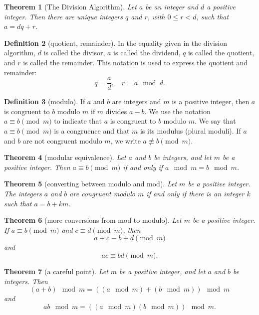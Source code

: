 \documentclass[letterpaper,10pt]{article}
\theoremstyle{plain}
\newtheorem{thm}{Theorem}[section]
\theoremstyle{definition}
\newtheorem{defn}[thm]{Definition}
\theoremstyle{remark}
\begin{document}
\begin{thm}[The Division Algorithm]
Let \(a\) be an integer and \(d\) a positive integer. Then there are unique integers \(q\) and \(r\), with \(0 \leq r < d\), such that \(a = dq + r\).

\end{thm}
\begin{defn}[quotient, remainder]
In the equality given in the division algorithm, \(d\) is called the divisor, \(a\) is called the dividend, \(q\) is called the quotient, and \(r\) is called the remainder. This notation is used to express the quotient and remainder:
\[q = \frac{a}{d}, \quad r = a \mod d.\]


\end{defn}

\begin{defn}[modulo]
If \(a\) and \(b\) are integers and \(m\) is a positive integer, then \(a\) is congruent to \(b\) modulo \(m\) if \(m\) divides \(a - b\). We use the notation \(a \equiv b \pmod{m}\) to indicate that \(a\) is congruent to \(b\) modulo \(m\). We say that \(a \equiv b \pmod{m}\) is a congruence and that \(m\) is its modulus (plural moduli). If \(a\) and \(b\) are not congruent modulo \(m\), we write \(a \not\equiv b \pmod{m}\).


\end{defn}
\begin{thm}[modular equivalence]
Let \(a\) and \(b\) be integers, and let \(m\) be a positive integer. Then \(a \equiv b \pmod{m}\) if and only if \(a \mod m = b \mod m\).

\end{thm}
\begin{thm}[converting between modulo and mod]
Let \(m\) be a positive integer. The integers \(a\) and \(b\) are congruent modulo \(m\) if and only if there is an integer \(k\) such that \(a = b + km\).


\end{thm}
\begin{thm}[more conversions from mod to modulo]
Let \(m\) be a positive integer. If \(a \equiv b \pmod{m}\) and \(c \equiv d \pmod{m}\), then
\[a + c \equiv b + d \pmod{m}\] and \[ac \equiv bd \pmod{m}.\]

\end{thm}
\begin{thm}[a careful point]
Let \(m\) be a positive integer, and let \(a\) and \(b\) be integers. Then
\[(a + b) \mod m = ((a \mod m) + (b \mod m)) \mod m\]
and
\[ab \mod m = ((a \mod m)(b \mod m)) \mod m.\]

\end{thm}
\newpage
\end{document}
